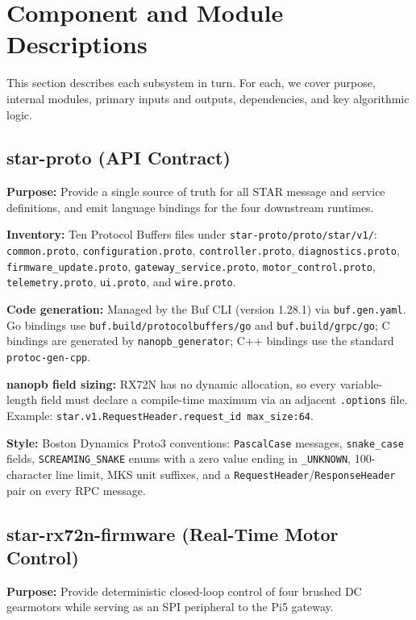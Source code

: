 \documentclass[11pt,letterpaper]{article}
\begin{document}
\section{Component and Module Descriptions}
\label{sec:component-descriptions}

This section describes each subsystem in turn. For each, we cover
purpose, internal modules, primary inputs and outputs, dependencies,
and key algorithmic logic.

\subsection{star-proto (API Contract)}
\textbf{Purpose:} Provide a single source of truth for all STAR
message and service definitions, and emit language bindings for the
four downstream runtimes.

\textbf{Inventory:} Ten Protocol Buffers files under
\texttt{star-proto/proto/star/v1/}: \texttt{common.proto},
\texttt{configuration.proto}, \texttt{controller.proto},
\texttt{diagnostics.proto}, \texttt{firmware\_update.proto},
\texttt{gateway\_service.proto}, \texttt{motor\_control.proto},
\texttt{telemetry.proto}, \texttt{ui.proto}, and \texttt{wire.proto}.

\textbf{Code generation:} Managed by the Buf CLI (version 1.28.1) via
\texttt{buf.gen.yaml}. Go bindings use
\texttt{buf.build/protocolbuffers/go} and
\texttt{buf.build/grpc/go}; C bindings are generated by
\texttt{nanopb\_generator}; C++ bindings use the standard
\texttt{protoc-gen-cpp}.

\textbf{nanopb field sizing:} RX72N has no dynamic allocation, so
every variable-length field must declare a compile-time maximum via
an adjacent \texttt{.options} file. Example:
\texttt{star.v1.RequestHeader.request\_id max\_size:64}.

\textbf{Style:} Boston Dynamics Proto3 conventions:
\texttt{PascalCase} messages, \texttt{snake\_case} fields,
\texttt{SCREAMING\_SNAKE} enums with a zero value ending in
\texttt{\_UNKNOWN}, 100-character line limit, MKS unit suffixes, and a
\texttt{RequestHeader}/\texttt{ResponseHeader} pair on every RPC
message.

\subsection{star-rx72n-firmware (Real-Time Motor Control)}
\textbf{Purpose:} Provide deterministic closed-loop control of four
brushed DC gearmotors while serving as an SPI peripheral to the Pi5
gateway.
\end{document}
